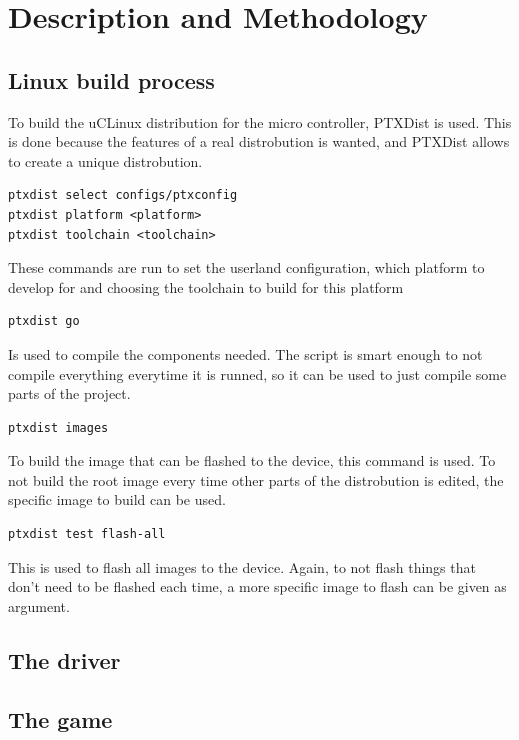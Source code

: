 \section{Description and Methodology}

\subsection{Linux build process}
To build the uCLinux distribution for the micro controller, PTXDist is used.\cite{ptxdistguru}
This is done because the features of a real distrobution is wanted, and PTXDist
allows to create a unique distrobution.

\begin{verbatim}
ptxdist select configs/ptxconfig
ptxdist platform <platform>
ptxdist toolchain <toolchain>
\end{verbatim}

These commands are run to set the userland configuration, which platform to
develop for and choosing the toolchain to build for this platform

\begin{verbatim}
ptxdist go
\end{verbatim}

Is used to compile the components needed. The script is smart enough to not
compile everything everytime it is runned, so it can be used to just compile
some parts of the project.

\begin{verbatim}
ptxdist images
\end{verbatim}

To build the image that can be flashed to the device, this command is used. To
not build the root image every time other parts of the distrobution is edited,
the specific image to build can be used.

\begin{verbatim}
ptxdist test flash-all
\end{verbatim}

This is used to flash all images to the device. Again, to not flash things that
don't need to be flashed each time, a more specific image to flash can be given
as argument.



\subsection{The driver}

\subsection{The game}

